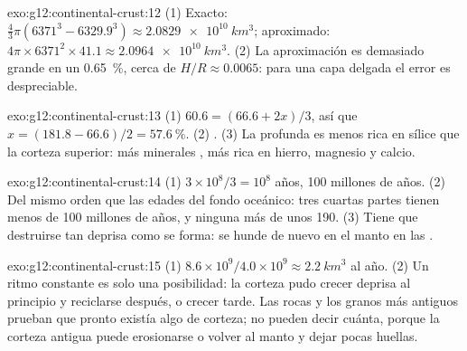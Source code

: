 \begin{solution}{exo:g12:continental-crust:12}
(1) Exacto: $\tfrac{4}{3}\pi(6371^3 - 6329.9^3) \approx
\qty{2.0829e10}{km^3}$; aproximado: $4\pi \times 6371^2 \times 41.1
\approx \qty{2.0964e10}{km^3}$. (2) La aproximación es demasiado grande en un
\qty{0.65}{\percent}, cerca de $H/R \approx 0.0065$: para una capa delgada el
error es despreciable.
\end{solution}

\begin{solution}{exo:g12:continental-crust:13}
(1) $60.6 = (66.6 + 2x)/3$, así que $x = (181.8 - 66.6)/2 = \qty{57.6}{\percent}$.
(2) . (3) La  profunda es menos rica en sílice
que la corteza superior: más minerales , más rica en hierro, magnesio y
calcio.
\end{solution}

\begin{solution}{exo:g12:continental-crust:14}
(1) $3 \times 10^8/3 = 10^8$ años, 100 millones de años. (2) Del mismo orden
que las edades del fondo oceánico: tres cuartas partes tienen menos de 100
millones de años, y ninguna más de unos 190. (3) Tiene que destruirse tan
deprisa como se forma: se hunde de nuevo en el manto en las .
\end{solution}

\begin{solution}{exo:g12:continental-crust:15}
(1) $8.6 \times 10^9 / 4.0 \times 10^9 \approx \qty{2.2}{km^3}$ al año.
(2) Un ritmo constante es solo una posibilidad: la corteza pudo crecer deprisa
al principio y reciclarse después, o crecer tarde. Las rocas y los granos más
antiguos prueban que pronto existía algo de corteza; no pueden decir cuánta,
porque la corteza antigua puede erosionarse o volver al manto y dejar pocas
huellas.
\end{solution}

